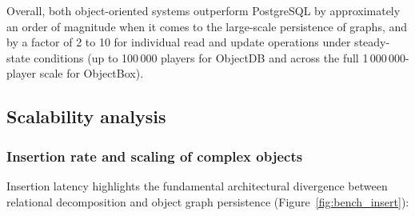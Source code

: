 \documentclass{article}
\begin{document}
Overall, both object-oriented systems outperform PostgreSQL by approximately an order of magnitude when it comes to the large-scale persistence of graphs, and by a factor of 2 to 10 for individual read and update operations under steady-state conditions (up to 100\,000 players for ObjectDB and across the full 1\,000\,000-player scale for ObjectBox).

\subsection{Scalability analysis}

\subsubsection{Insertion rate and scaling of complex objects}
Insertion latency highlights the fundamental architectural divergence between relational decomposition and object graph persistence (Figure~\ref{fig:bench_insert}):
\end{document}
